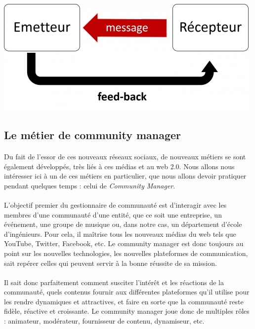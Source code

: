 \begin{center}
\includegraphics[scale=0.5]{./image/communication_digitale.png}
\end{center}

\subsection{Le métier de community manager}

\paragraph{}
Du fait de l'essor de ces nouveaux réseaux sociaux, de nouveaux métiers se sont également développés, 
très liés à ces médias et au web 2.0. Nous allons nous intéresser ici à un de ces métiers en particulier, 
que nous allons devoir pratiquer pendant quelques temps : celui de \emph{Community Manager}.

\paragraph{}
L'objectif premier du gestionnaire de communauté est d'interagir avec les membres d'une communauté d'une 
entité, que ce soit une entreprise, un événement, une groupe de musique ou, dans notre cas, un département 
d'école d'ingénieurs. Pour cela, il maîtrise tous les nouveaux médias du web tels que YouTube, Twitter, 
Facebook, etc. Le community manager est donc toujours au point sur les nouvelles technologies, les nouvelles 
plateformes de communication, sait repérer celles qui peuvent servir à la bonne réussite de sa mission. 

\paragraph{}
Il sait donc parfaitement comment susciter l'intérêt et les réactions de la communauté, quels contenus fournir 
aux différentes plateformes qu'il utilise pour les rendre dynamiques et attractives, et faire en sorte que la 
communauté reste fidèle, réactive et croissante.
Le community manager joue donc de multiples rôles : animateur, modérateur, fournisseur de contenu, dynamiseur, etc. 

